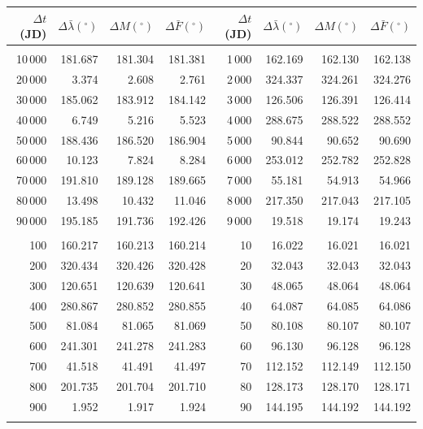 \begin{table}[!h]
\centering
\begin{tabular}{rrrr|rrrr}
$\Delta t$(JD)& $\Delta\bar{\lambda}(^\circ)$ &  $\Delta M(^\circ)$ & $\Delta \bar{F}(^\circ)$& $\Delta t$(JD) & $\Delta\bar{\lambda}(^\circ)$ & $\Delta M(^\circ)$ 
&$\Delta \bar{F}(^\circ)$\\ \hline
&&&&&&&\\[-1.75ex]
10\,000 & 181.687 & 181.304 & 181.381 & 1\,000 & 162.169 & 162.130 & 162.138\\
20\,000 &   3.374 &   2.608 &   2.761 & 2\,000 & 324.337 & 324.261 & 324.276\\
30\,000 & 185.062 & 183.912 & 184.142 & 3\,000 & 126.506 & 126.391 & 126.414\\
40\,000 &   6.749 &   5.216 &   5.523 & 4\,000 & 288.675 & 288.522 & 288.552\\
50\,000 & 188.436 & 186.520 & 186.904 & 5\,000 &  90.844 &  90.652 &  90.690\\
60\,000 &  10.123 &   7.824 &   8.284 & 6\,000 & 253.012 & 252.782 & 252.828\\
70\,000 & 191.810 & 189.128 & 189.665 & 7\,000 &  55.181 &  54.913 &  54.966\\
80\,000 &  13.498 &  10.432 &  11.046 & 8\,000 & 217.350 & 217.043 & 217.105\\
90\,000 & 195.185 & 191.736 & 192.426 & 9\,000 &  19.518 &  19.174 &  19.243\\
&&&&&&&\\
100 & 160.217 & 160.213 & 160.214 & 10 &  16.022 &  16.021 &  16.021\\
200 & 320.434 & 320.426 & 320.428 & 20 &  32.043 &  32.043 &  32.043\\
300 & 120.651 & 120.639 & 120.641 & 30 &  48.065 &  48.064 &  48.064\\
400 & 280.867 & 280.852 & 280.855 & 40 &  64.087 &  64.085 &  64.086\\
500 &  81.084 &  81.065 &  81.069 & 50 &  80.108 &  80.107 &  80.107\\
600 & 241.301 & 241.278 & 241.283 & 60 &  96.130 &  96.128 &  96.128\\
700 &  41.518 &  41.491 &  41.497 & 70 & 112.152 & 112.149 & 112.150\\
800 & 201.735 & 201.704 & 201.710 & 80 & 128.173 & 128.170 & 128.171\\
900 &   1.952 &   1.917 &   1.924 & 90 & 144.195 & 144.192 & 144.192\\
&&&&&&&\\

\end{tabular}
\end{table}
